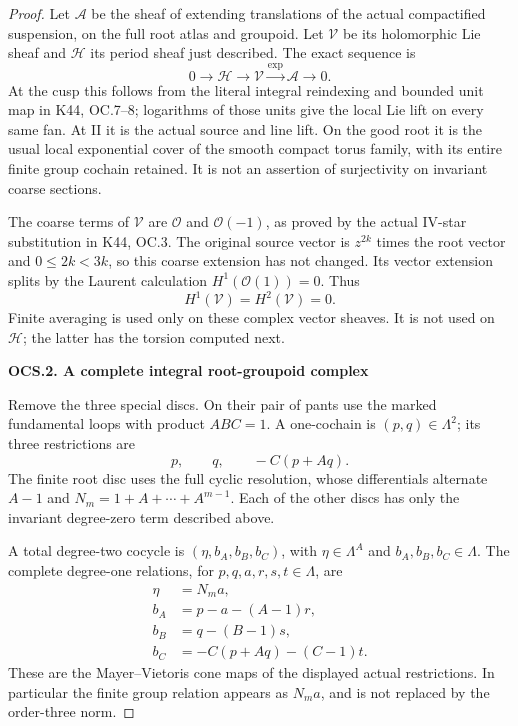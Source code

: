 \begin{proof}
Let \(\mathcal A\) be the sheaf of extending translations of the
actual compactified suspension, on the full root atlas and groupoid.
Let \(\mathcal V\) be its holomorphic Lie sheaf and \(\mathcal H\)
its period sheaf just described. The exact sequence is
\[
 0\longrightarrow\mathcal H\longrightarrow\mathcal V
                  \xrightarrow{\exp}\mathcal A\longrightarrow0.
\tag{OCS.4}
\]
At the cusp this follows from the literal integral reindexing and
bounded unit map in K44, OC.7--8; logarithms of those units give
the local Lie lift on every same fan. At II it is the actual source
and line lift. On the good root it is the usual local exponential
cover of the smooth compact torus family, with its entire finite
group cochain retained. It is not an assertion of surjectivity on
invariant coarse sections.

The coarse terms of \(\mathcal V\) are \(\mathcal O\) and
\(\mathcal O(-1)\), as proved by the actual IV-star substitution
in K44, OC.3. The original source vector is \(z^{2k}\) times the
root vector and \(0\le2k<3k\), so this coarse extension has not
changed. Its vector extension splits by the Laurent calculation
\(H^1(\mathcal O(1))=0\). Thus
\[
                  H^1(\mathcal V)=H^2(\mathcal V)=0.
\tag{OCS.5}
\]
Finite averaging is used only on these complex vector sheaves.
It is not used on \(\mathcal H\); the latter has the torsion
computed next.

\par

\medskip\noindent\textbf{OCS.2. A complete integral root-groupoid complex}

\par\nobreak

Remove the three special discs. On their pair of pants use the
marked fundamental loops with product \(ABC=1\). A one-cochain
is \((p,q)\in\Lambda^2\); its three restrictions are
\[
                    p,\qquad q,\qquad -C(p+Aq).
\tag{OCS.6}
\]
The finite root disc uses the full cyclic resolution, whose
differentials alternate \(A-1\) and
\(N_m=1+A+\cdots+A^{m-1}\). Each of the other discs has only
the invariant degree-zero term described above.

A total degree-two cocycle is
\((\eta,b_A,b_B,b_C)\), with \(\eta\in\Lambda^A\) and
\(b_A,b_B,b_C\in\Lambda\). The complete degree-one relations,
for \(p,q,a,r,s,t\in\Lambda\), are
\[
 \begin{split}
 \eta&=N_m a,\\
 b_A&=p-a-(A-1)r,\\
 b_B&=q-(B-1)s,\\
 b_C&=-C(p+Aq)-(C-1)t.
 \end{split}                                           \tag{OCS.7}
\]
These are the Mayer--Vietoris cone maps of the displayed actual
restrictions. In particular the finite group relation appears as
\(N_m a\), and is not replaced by the order-three norm.


\end{proof}
